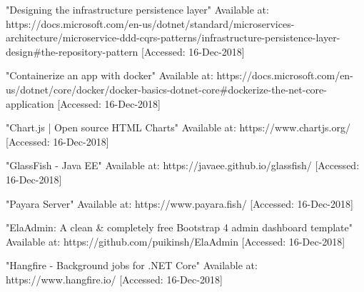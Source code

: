  "Designing the infrastructure persistence layer" Available at: https://docs.microsoft.com/en-us/dotnet/standard/microservices-architecture/microservice-ddd-cqrs-patterns/infrastructure-persistence-layer-design\#the-repository-pattern [Accessed: 16-Dec-2018]

 "Containerize an app with docker" Available at: https://docs.microsoft.com/en-us/dotnet/core/docker/docker-basics-dotnet-core\#dockerize-the-net-core-application [Accessed: 16-Dec-2018]

 "Chart.js | Open source HTML Charts" Available at: https://www.chartjs.org/ [Accessed: 16-Dec-2018]

 "GlassFish - Java EE" Available at: https://javaee.github.io/glassfish/ [Accessed: 16-Dec-2018]

 "Payara Server" Available at: https://www.payara.fish/ [Accessed: 16-Dec-2018]

 "ElaAdmin: A clean \& completely free Bootstrap 4 admin dashboard template" Available at: https://github.com/puikinsh/ElaAdmin [Accessed: 16-Dec-2018]

 "Hangfire - Background jobs for .NET Core" Available at: https://www.hangfire.io/ [Accessed: 16-Dec-2018]
